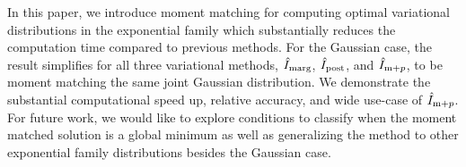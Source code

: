 In this paper, we introduce moment matching for computing optimal variational 
distributions in the exponential family which substantially reduces the 
computation time compared to previous methods. For the Gaussian case, 
the result simplifies for all three variational methods, $\hat{I}_{\text{marg}}$, $\hat{I}_{\text{post}}$,
and $\hat{I}_{\text{m}+p}$, to be moment matching the same joint Gaussian distribution. We 
demonstrate the substantial computational speed up, relative accuracy, and wide
use-case of $\hat{I}_{\text{m}+p}$. For future work, we would like to explore conditions to 
classify when the moment matched solution is a global minimum as well as 
generalizing the method to other exponential family distributions besides the
Gaussian case. 
